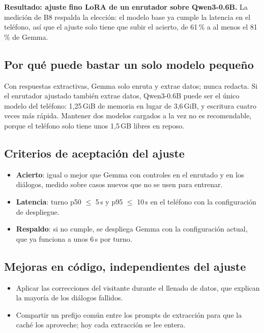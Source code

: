 \documentclass[11pt,a4paper]{article}
\begin{document}
\textbf{Resultado: ajuste fino LoRA de un enrutador sobre Qwen3-0.6B.} La medición de B8 respalda la elección: el modelo base ya cumple la latencia en el teléfono, así que el ajuste solo tiene que subir el acierto, de 61\,\% a al menos el 81\,\% de Gemma.

\subsection{Por qué puede bastar un solo modelo pequeño}

Con respuestas extractivas, Gemma solo enruta y extrae datos; nunca redacta. Si el enrutador ajustado también extrae datos, Qwen3-0.6B puede ser el único modelo del teléfono: 1,25\,GiB de memoria en lugar de 3,6\,GiB, y escritura cuatro veces más rápida. Mantener dos modelos cargados a la vez no es recomendable, porque el teléfono solo tiene unos 1,5\,GB libres en reposo.

\subsection{Criterios de aceptación del ajuste}

\begin{itemize}
\item \textbf{Acierto}: igual o mejor que Gemma con controles en el enrutado y en los diálogos, medido sobre casos nuevos que no se usen para entrenar.
\item \textbf{Latencia}: turno p50 $\le$ 5\,s y p95 $\le$ 10\,s en el teléfono con la configuración de despliegue.
\item \textbf{Respaldo}: si no cumple, se despliega Gemma con la configuración actual, que ya funciona a unos 6\,s por turno.
\end{itemize}

\subsection{Mejoras en código, independientes del ajuste}

\begin{itemize}
\item Aplicar las correcciones del visitante durante el llenado de datos, que explican la mayoría de los diálogos fallidos.
\item Compartir un prefijo común entre los prompts de extracción para que la caché los aproveche; hoy cada extracción se lee entera.
\end{itemize}
\end{document}
